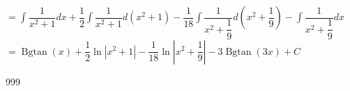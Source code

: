 \documentclass[a4paper]{article}
\newcommand{\Bgtan}{\operatorname{Bgtan}}
\begin{document}
$ =  \displaystyle\int\dfrac{1}{x^2+1}dx
+ \dfrac{1}{2}\displaystyle\int\dfrac{1}{x^2+1}d\left(x^2+1\right)
-\dfrac{1}{18}\displaystyle\int\dfrac{1}{x^2+\dfrac{1}{9}}d\left(x^2+\dfrac{1}{9}\right) 
- \displaystyle\int\dfrac{1}{x^2+\dfrac{1}{9}}dx $\\

$ = \Bgtan\left(x\right)
+ \dfrac{1}{2}\ln|x^2+1|
-\dfrac{1}{18}\ln\left|x^2+\dfrac{1}{9}\right|
-3\Bgtan\left(3x\right) + C $\\

\begin{thebibliography}{999}
\end{thebibliography}
\end{document}
